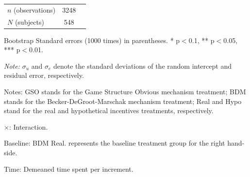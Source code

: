 \documentclass[12pt]{article}
\begin{document}
\begin{table}[H]
{\begin{tabular}{l*{1}{cc}}
\hline
\(n\) (observations)      &        3248         &            \\
\(N\) (subjects)       &        548         &            \\
\hline \hline
\end{tabular}
}

\begin{tablenotes}
            \footnotesize
            \item Bootstrap Standard errors (1000 times) in parentheses. * p$<$0.1, ** p$<$0.05, *** p$<$0.01.
            \item \textit{Note:} $\sigma_u$ and $\sigma_e$ denote the standard deviations of the random intercept and residual error, respectively.
            \item Notes: GSO stands for the Game Structure Obvious mechanism treatment; BDM stands for the Becker-DeGroot-Marschak mechanism treatment; Real and Hypo stand for the real and hypothetical incentives treatments, respectively.
           \item $\times$: Interaction.
           \item Baseline: BDM Real. represents the baseline treatment group for the right hand-side.
           \item Time: Demeaned time spent per increment.
        \end{tablenotes}
\end{table}
\end{document}
